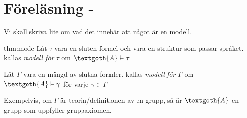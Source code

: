 \section{Föreläsning - }
\par\bigskip
\noindent Vi skall skriva lite om vad det innebär att något är en modell.
\par\bigskip
\begin{theo}[Modell]{thm:mode}
  Låt $\tau$ vara en sluten formel och  vara en struktur som passar språket.  kallas \textit{modell för $\tau$} om $\textgoth{A}\vDash\tau$
  \par\bigskip
  \noindent Låt $\Gamma$ vara en mängd av slutna formler.  kallas \textit{modell för $\Gamma$} om $\textgoth{A}\vDash\gamma$ för varje $\gamma\in\Gamma$
\end{theo}
\par\bigskip
\noindent Exempelvis, om $\Gamma$ är teorin/definitionen av en grupp, så är $\textgoth{A}$ en grupp som uppfyller gruppaxiomen.
\par\bigskip
